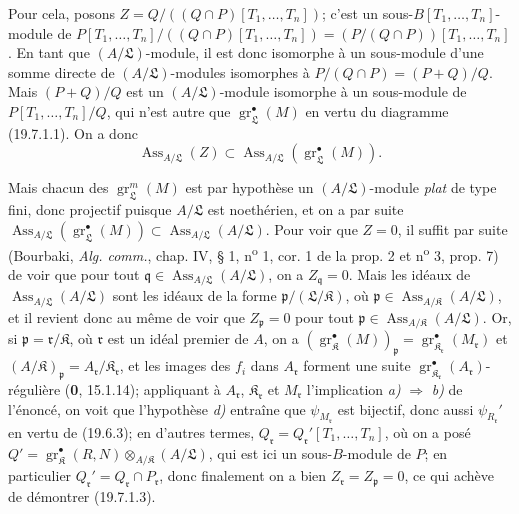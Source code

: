 Pour cela, posons $Z=Q/((Q\cap P)[T_1,\ldots,T_n])$; c'est un sous-$B[T_1,\ldots,T_n]$-module de $P[T_1,\ldots,T_n]/((Q\cap P)[T_1,\ldots,T_n])=(P/(Q\cap P))[T_1,\ldots,T_n]$. En tant que $(A/\mathfrak L)$-module, il est donc isomorphe à un sous-module d'une somme directe de $(A/\mathfrak L)$-modules isomorphes à $P/(Q\cap P)=(P+Q)/Q$. Mais $(P+Q)/Q$ est un $(A/\mathfrak L)$-module isomorphe à un sous-module de $P[T_1,\ldots,T_n]/Q$, qui n'est autre que $\operatorname{gr}_{\mathfrak L}^\bullet(M)$ en vertu du diagramme (19.7.1.1). On a donc
\begin{equation}
  \operatorname{Ass}_{A/\mathfrak L}(Z)\subset\operatorname{Ass}_{A/\mathfrak L}(\operatorname{gr}_{\mathfrak L}^\bullet(M)).
  \tag{19.7.1.4}\label{IV.19.7.1.4}
\end{equation}

Mais chacun des $\operatorname{gr}_{\mathfrak L}^m(M)$ est par hypothèse un $(A/\mathfrak L)$-module \emph{plat} de type fini, donc projectif puisque $A/\mathfrak L$ est noethérien, et on a par suite $\operatorname{Ass}_{A/\mathfrak L}(\operatorname{gr}_{\mathfrak L}^\bullet(M))\subset\operatorname{Ass}_{A/\mathfrak L}(A/\mathfrak L)$. Pour voir que $Z=0$, il suffit par suite (Bourbaki, \emph{Alg. comm.}, chap. IV, § 1, n\textsuperscript{o} 1, cor. 1 de la prop. 2 et n\textsuperscript{o} 3, prop. 7) de voir que pour tout $\mathfrak q\in\operatorname{Ass}_{A/\mathfrak L}(A/\mathfrak L)$, on a $Z_{\mathfrak q}=0$. Mais les idéaux de $\operatorname{Ass}_{A/\mathfrak L}(A/\mathfrak L)$ sont les idéaux de la forme $\mathfrak p/(\mathfrak L/\mathfrak K)$, où $\mathfrak p\in\operatorname{Ass}_{A/\mathfrak K}(A/\mathfrak L)$, et il revient donc au même de voir que $Z_{\mathfrak p}=0$ pour tout $\mathfrak p\in\operatorname{Ass}_{A/\mathfrak K}(A/\mathfrak L)$. Or, si $\mathfrak p=\mathfrak r/\mathfrak K$, où $\mathfrak r$ est un idéal premier de $A$, on a $(\operatorname{gr}_{\mathfrak K}^\bullet(M))_{\mathfrak p}=\operatorname{gr}_{\mathfrak K_{\mathfrak r}}^\bullet(M_{\mathfrak r})$ et $(A/\mathfrak K)_{\mathfrak p}=A_{\mathfrak r}/\mathfrak K_{\mathfrak r}$, et les images des $f_i$ dans $A_{\mathfrak r}$ forment une suite $\operatorname{gr}_{\mathfrak K_{\mathfrak r}}^\bullet(A_{\mathfrak r})$-régulière (\textbf{0}, 15.1.14); appliquant à $A_{\mathfrak r}$, $\mathfrak K_{\mathfrak r}$ et $M_{\mathfrak r}$ l'implication \emph{a)} $\Rightarrow$ \emph{b)} de l'énoncé, on voit que l'hypothèse \emph{d)} entraîne que $\psi_{M_{\mathfrak r}}$ est bijectif, donc aussi $\psi_{R_{\mathfrak r}}'$ en vertu de (19.6.3); en d'autres termes, $Q_{\mathfrak r}=Q_{\mathfrak r}'[T_1,\ldots,T_n]$, où on a posé $Q'=\operatorname{gr}_{\mathfrak K}^\bullet(R,N)\otimes_{A/\mathfrak K}(A/\mathfrak L)$, qui est ici un sous-$B$-module de $P$; en particulier $Q_{\mathfrak r}'=Q_{\mathfrak r}\cap P_{\mathfrak r}$, donc finalement on a bien $Z_{\mathfrak r}=Z_{\mathfrak p}=0$, ce qui achève de démontrer (19.7.1.3).

